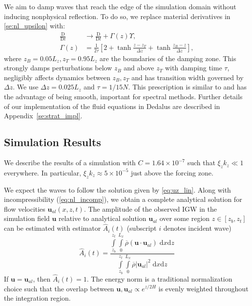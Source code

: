 \documentclass[
        fleqn,
        usenatbib,
    ]{mnras}
\newcommand*{\scinot}[2]{#1\times10^{#2}}
\newcommand*{\md}[2]{\frac{\mathrm{D}#1}{\mathrm{D}#2}}
\newcommand*{\abs}[1]{\left|#1\right|}
\newcommand*{\p}[1]{\left(#1\right)}
\newcommand*{\s}[1]{\left[#1\right]}
\newcommand*{\bm}[1]{\mathbf{#1}}
\begin{document}
We aim to damp waves that reach the edge of the simulation domain without
inducing nonphysical reflection. To do so, we replace material derivatives
in \autoref{se:nl_upsilon} with:
\begin{align}
    \md{}{t} &\to \md{}{t} + \Gamma(z)\Upsilon,\nonumber\\
    \Gamma(z) &= \frac{1}{2\tau}\s{2 + \tanh \frac{z - z_T}{\Delta z}
        + \tanh \frac{z_B - z}{\Delta z}},\label{eq:Gamma}
\end{align}
where $z_B = 0.05L_z, z_T = 0.95L_z$ are the boundaries of the damping zone.
This strongly damps perturbations below $z_B$ and above $z_T$ with damping time
$\tau$, negligibly affects dynamics between $z_B, z_T$ and has transition width
governed by $\Delta z$. We use $\Delta z = 0.025L_z$ and $\tau = 1/15N$. This
prescription is similar to \citep{lecoanet_damp} and has the advantage of being
smooth, important for spectral methods. Further details of our implementation of
the fluid equations in Dedalus are described in Appendix~\ref{se:strat_impl}.

\subsection{Simulation Results}\label{ss:lin_ns}

We describe the results of a simulation with $C = \scinot{1.64}{-7}$ such that
$\xi_z k_z \ll 1$ everywhere. In particular, $\xi_z k_z \approx \scinot{5}{-5}$
just above the forcing zone.

We expect the waves to follow the solution given by \autoref{eq:uz_lin}. Along
with incompressibility (\autoref{eq:nl_incomp}), we obtain a complete analytical
solution for flow velocities $\bm{u}_{al}(x, z, t)$. The amplitude of the
observed IGW in the simulation field $\bm{u}$ relative to analytical solution
$\bm{u}_{al}$ over some region $z \in [z_b, z_t]$ can be estimated with
estimator $\hat{A}_i(t)$ (subscript $i$ denotes incident wave)
\begin{equation}
    \hat{A}_i(t) = \frac{\int\limits_{z_b}^{z_t}\int\limits_0^{L_x}
        \overline{\rho}\p{\bm{u} \cdot \bm{u}_{al}}\;\mathrm{d}x\mathrm{d}z}
        {\int\limits_{z_b}^{z_t}\int\limits_0^{L_x}
        \overline{\rho}\abs{\bm{u}_{al}}^2\;\mathrm{d}x\mathrm{d}z}
        \label{eq:ahat_def}
\end{equation}
If $\bm{u} = \bm{u}_{al}$, then $\hat{A}_i(t) = 1$. The energy norm is a
traditional normalization choice such that the overlap between $\bm{u},
\bm{u}_{al} \propto e^{z/2H}$ is evenly weighted throughout the integration
region.
\end{document}
